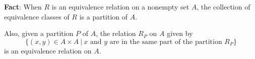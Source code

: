 
{\bf Fact}: When $R$ is an equivalence relation on a nonempty set $A$, 
the collection of equivalence classes of $R$ is a partition of $A$.

Also, given a partition $P$ of $A$, the relation $R_P$ on $A$ given by 
\[
    \{ (x,y) \in A \times A ~|~ \text{$x$ and $y$ are in the same part of the partition $R_P$}\}
\]
is an equivalence relation on $A$.
